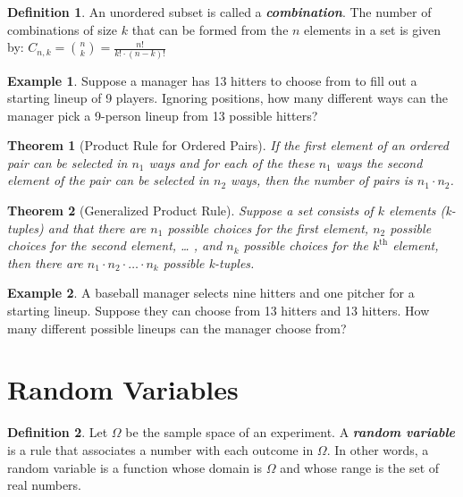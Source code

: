 \documentclass[
  11pt,
]{book}
\newtheorem{theorem}{Theorem}[chapter]
\theoremstyle{definition}
\newtheorem{definition}{Definition}[chapter]
\theoremstyle{definition}
\newtheorem{example}{Example}[chapter]
\theoremstyle{definition}
\theoremstyle{definition}
\theoremstyle{remark}
\begin{document}
\vfill

\begin{definition}
An unordered subset is called a \textbf{\emph{combination}}. The number of combinations of size \(k\) that can be formed from the \(n\) elements in a set is given by: \(C_{n,k} = {n \choose k} = \frac{n!}{k! \cdot (n-k)!}\)
\end{definition}

\begin{example}
Suppose a manager has 13 hitters to choose from to fill out a starting lineup of 9 players. Ignoring positions, how many different ways can the manager pick a 9-person lineup from 13 possible hitters?
\end{example}

\vfill

\newpage

\begin{theorem}[Product Rule for Ordered Pairs]
If the first element of an ordered pair can be selected in \(n_1\) ways and for each of the these \(n_1\) ways the second element of the pair can be selected in \(n_2\) ways, then the number of pairs is \(n_1 \cdot n_2\).
\end{theorem}

\begin{theorem}[Generalized Product Rule]
Suppose a set consists of \(k\) elements (k-tuples) and that there are \(n_1\) possible choices for the first element, \(n_2\) possible choices for the second element, \ldots{} , and \(n_k\) possible choices for the \(k^\text{th}\) element, then there are \(n_1 \cdot n_2 \cdot \ldots \cdot n_k\) possible k-tuples.
\end{theorem}

\begin{example}
A baseball manager selects nine hitters and one pitcher for a starting lineup. Suppose they can choose from 13 hitters and 13 hitters. How many different possible lineups can the manager choose from?
\end{example}

\vfill

\newpage

\hypertarget{random-variables}{%
\section{Random Variables}\label{random-variables}}

\begin{definition}
Let \(\Omega\) be the sample space of an experiment. A \textbf{\emph{random variable}} is a rule that associates a number with each outcome in \(\Omega\). In other words, a random variable is a function whose domain is \(\Omega\) and whose range is the set of real numbers.
\end{definition}
\end{document}
